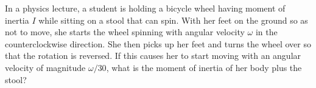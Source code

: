 In a physics lecture, a student is holding a bicycle wheel having moment
of inertia $I$ while sitting on a stool that can spin. With her feet on the ground
so as not to move, she starts the wheel spinning with angular velocity
$\omega$ in the counterclockwise direction. She then picks up her feet
and turns the wheel over so that the rotation is reversed.  If this
causes her to start moving with an angular velocity of magnitude
$\omega/30$, what is the moment of inertia of her body plus the stool?\answercheck
